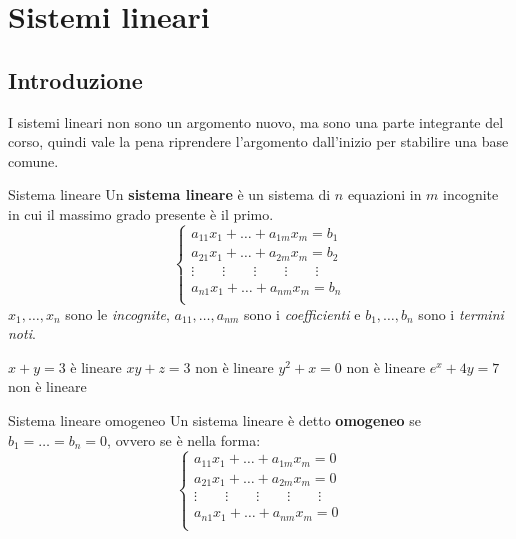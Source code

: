 \chapter{Sistemi lineari}
\section{Introduzione}
I sistemi lineari non sono un argomento nuovo, ma sono una parte integrante del corso, quindi vale la pena riprendere l'argomento dall'inizio per stabilire una base comune.
\begin{newdef}{Sistema lineare}
    Un \textbf{sistema lineare} è un sistema di $n$ equazioni in $m$ incognite in cui il massimo grado presente è il primo.
    \[
        \begin{cases}
            a_{11}x_{1} + \dots + a_{1m}x_{m} = b_1 \\
            a_{21}x_{1} + \dots + a_{2m}x_{m} = b_2 \\
            \vdots \quad\quad \vdots \quad\quad \vdots \quad\quad \vdots \quad\quad \vdots \\
            a_{n1}x_{1} + \dots + a_{nm}x_{m} = b_n \\  
        \end{cases}
    \]
    $x_1, \dots, x_n$ sono le \textit{incognite}, $a_{11}, \dots, a_{nm}$ sono i \textit{coefficienti} e $b_1, \dots, b_n$ sono i \textit{termini noti}.
\end{newdef}

\begin{center}
    $x + y = 3$ è lineare \hspace{2cm} $xy + z = 3$ non è lineare \hspace{2cm} $y^2 + x = 0$ non è lineare \hspace{2cm} $e^x + 4y = 7$ non è lineare
\end{center}

\begin{newdef}{Sistema lineare omogeneo}
    Un sistema lineare è detto \textbf{omogeneo} se $b_1 = \dots = b_n = 0$, ovvero se è nella forma:
    \[
        \begin{cases}
            a_{11}x_{1} + \dots + a_{1m}x_{m} = 0 \\
            a_{21}x_{1} + \dots + a_{2m}x_{m} = 0 \\
            \vdots \quad\quad \vdots \quad\quad \vdots \quad\quad \vdots \quad\quad \vdots \\
            a_{n1}x_{1} + \dots + a_{nm}x_{m} = 0 \\  
        \end{cases}
    \]
\end{newdef}

